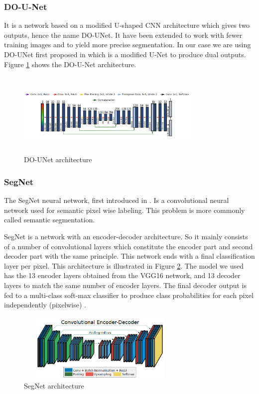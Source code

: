 \documentclass[conference]{IEEEtran}
\begin{document}
\subsubsection{\textbf{DO-U-Net}}
It is a network based on a modified U-shaped CNN architecture which gives two outputs, hence the name DO-UNet. It have been extended to work with fewer training images and to yield more precise segmentation. In our case we are using DO-UNet first proposed in \cite{10.1007/978-3-030-44584-3_31} which is a modified U-Net to produce dual outputs.
Figure \ref{fig:DO-UNET} shows the DO-U-Net architecture.

\begin{figure}[ht]
\centering
    \centerline{\includegraphics[width = 3.5in, height=1.6in]{../images/DO-UNET.png}}
    \caption{DO-UNet architecture}
    \label{fig:DO-UNET}
\end{figure}

\subsubsection{\textbf{SegNet}}

The SegNet neural network, first introduced in \cite{badrinarayanan2017segnet}. Is a convolutional neural network used for semantic pixel wise labeling. This problem is more commonly called semantic segmentation.

SegNet is a network with an encoder-decoder architecture. So it mainly consists of a number of convolutional layers which constitute the encoder part and second decoder part with the same principle. This network ends with a final classification layer per pixel. This architecture is illustrated in Figure \ref{segnet}.
The model we used has the 13 encoder layers obtained from the VGG16 network, and 13 decoder layers to match the same number of encoder layers. The final decoder output is fed to a multi-class soft-max classifier to produce class probabilities for each pixel independently (pixelwise) \cite{badrinarayanan2017segnet}.

\begin{figure}[ht]
\centering
  \vspace{-0.1in}
    \centerline{\includegraphics[width = 3.2in, height = 1.3in]{../images/segnet.png}}
    \caption{SegNet architecture}
    \label{segnet}
\end{figure}
\end{document}
